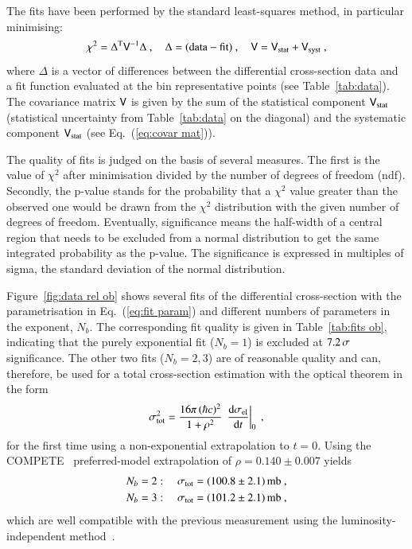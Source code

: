 The fits have been performed by the standard least-squares method, in particular minimising:
\begin{equation}
\label{eq:chi sq}
\chi^2 = \Delta^{\rm T} \mathsf{V}^{-1} \Delta\ ,\quad \Delta = (\hbox{data} - \hbox{fit})\ ,\quad \mathsf{V} = \mathsf{V}_{\rm stat} + \mathsf{V}_{\rm syst}\ ,
\end{equation}
where $\Delta$ is a vector of differences between the differential cross-section data and a fit function evaluated at the bin representative points (see Table~\ref{tab:data}). The covariance matrix $\mathsf{V}$ is given by the sum of the statistical component $\mathsf{V}_{\rm stat}$ (statistical uncertainty from Table~\ref{tab:data} on the diagonal) and the systematic component $\mathsf{V}_{\rm stat}$ (see Eq.~(\ref{eq:covar mat})).

The quality of fits is judged on the basis of several measures. The first is the value of $\chi^2$ after minimisation divided by the number of degrees of freedom (ndf). Secondly, the p-value stands for the probability that a $\chi^2$ value greater than the observed one would be drawn from the $\chi^2$ distribution with the given number of degrees of freedom. Eventually, significance means the half-width of a central region that needs to be excluded from a normal distribution to get the same integrated probability as the p-value. The significance is expressed in multiples of sigma, the standard deviation of the normal distribution.

Figure~\ref{fig:data rel ob} shows several fits of the differential cross-section with the parametrisation in Eq.~(\ref{eq:fit param}) and different numbers of parameters in the exponent, $N_b$. The corresponding fit quality is given in Table~\ref{tab:fits ob}, indicating that the purely exponential fit ($N_b = 1$) is excluded at $7.2\,{\rm \sigma}$ significance.
%
The other two fits ($N_b = 2, 3$) are of reasonable quality and can, therefore, be used for a total cross-section estimation with the optical theorem in the form
\begin{equation}
\label{eq:si tot}
\sigma_{\rm tot}^2 = {16\pi\, (\hbar c)^2\over 1 + \rho^2}\, \left. {\rm d}\sigma_{\rm el}\over{\rm d} t\right|_0\ ,
\end{equation}
for the first time using a non-exponential extrapolation to $t=0$. Using the COMPETE~\cite{compete} preferred-model extrapolation of $\rho = 0.140\pm 0.007$ yields
\begin{equation}
\label{eq:si tot results}
	\begin{aligned}
		N_b &= 2:\quad \sigma_{\rm tot} = (100.8 \pm 2.1)\un{mb}\ ,\\	%
		N_b &= 3:\quad \sigma_{\rm tot} = (101.2 \pm 2.1)\un{mb}\ ,\\	%
	\end{aligned}
\end{equation}
which are well compatible with the previous measurement using the luminosity-independent method~\cite{prl111}.

